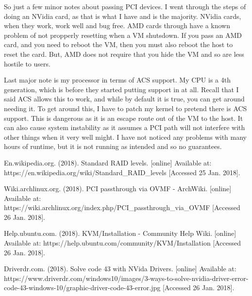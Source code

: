 \documentclass[12pt]{article}
\begin{document}
So just a few minor notes about passing PCI devices.
I went through the steps of doing an NVidia card, as that is what I have and is the majority.
NVidia cards, when they work, work well and bug free.
AMD cards through have a known problem of not propperly resetting when a VM shutsdown.
If you pass an AMD card, and you need to reboot the VM, then you must also reboot the host to reset the card.
But, AMD does not require that you hide the VM and so are less hostile to users.

Last major note is my processor in terms of ACS support.
My CPU is a 4th generation, which is before they started putting support in at all.
Recall that I said ACS allows this to work, and while by default it is true, you can get around needing it.
To get around this, I have to patch my kernel to pretend there is ACS support.
This is dangerous as it is an escape route out of the VM to the host.
It can also cause system instability as it assumes a PCI path will not interfere with other things when it very well might.
I have not noticed any problems with many hours of runtime, but it is not running as intended and so no guarantees.

\clearpage
\newpage
\begin{thebibliography}{9}

	En.wikipedia.org. (2018). Standard RAID levels. [online] Available at: https://en.wikipedia.org/wiki/Standard\_RAID\_levels [Accessed 25 Jan. 2018].

	Wiki.archlinux.org. (2018). PCI passthrough via OVMF - ArchWiki. [online] Available at: https://wiki.archlinux.org/index.php/PCI\_passthrough\_via\_OVMF [Accessed 26 Jan. 2018].

	Help.ubuntu.com. (2018). KVM/Installation - Community Help Wiki. [online] Available at: https://help.ubuntu.com/community/KVM/Installation [Accessed 26 Jan. 2018].

	Driverdr.com. (2018). Solve code 43 with NVida Drivers. [online] Available at: https://www.driverdr.com/windows10/images/3-ways-to-solve-nvidia-driver-error-code-43-windows-10/graphic-driver-code-43-error.jpg [Accessed 26 Jan. 2018].

\end{thebibliography}
\end{document}
